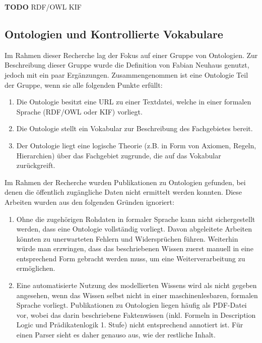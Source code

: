 \documentclass{article}
\begin{document}
\textbf{TODO}
RDF/OWL
KIF

\subsection{Ontologien und Kontrollierte Vokabulare}

Im Rahmen dieser Recherche lag der Fokus auf einer Gruppe von Ontologien.
Zur Beschreibung dieser Gruppe wurde die Definition von Fabian Neuhaus \cite{neuhaus2018ontology} genutzt, jedoch mit ein paar Ergänzungen.
Zusammengenommen ist eine Ontologie Teil der Gruppe, wenn sie alle folgenden Punkte erfüllt:

\begin{enumerate}
    \item Die Ontologie besitzt eine URL zu einer Textdatei, welche in einer formalen Sprache (RDF/OWL oder KIF) vorliegt.
    \item Die Ontologie stellt ein Vokabular zur Beschreibung des Fachgebietes bereit.
    \item Der Ontologie liegt eine logische Theorie (z.B. in Form von Axiomen, Regeln, Hierarchien) über das Fachgebiet zugrunde, die auf das Vokabular zurückgreift.
\end{enumerate}

Im Rahmen der Recherche wurden Publikationen zu Ontologien gefunden, bei denen die öffentlich zugängliche Daten nicht ermittelt werden konnten.
Diese Arbeiten wurden aus den folgenden Gründen ignoriert:
\begin{enumerate}
    \item Ohne die zugehörigen Rohdaten in formaler Sprache kann nicht sichergestellt werden, dass eine Ontologie vollständig vorliegt. Davon abgeleitete Arbeiten könnten zu unerwarteten Fehlern und Widersprüchen führen. Weiterhin würde man erzwingen, dass das beschriebenen Wissen zuerst manuell in eine entsprechend Form gebracht werden muss, um eine Weiterverarbeitung zu ermöglichen.
    \item Eine automatisierte Nutzung des modellierten Wissens wird als nicht gegeben angesehen, wenn das Wissen selbst nicht in einer maschinenlesbaren, formalen Sprache vorliegt. Publikationen zu Ontologien liegen häufig als PDF-Datei vor, wobei das darin beschriebene Faktenwissen (inkl. Formeln in Description Logic und Prädikatenlogik 1. Stufe) nicht entsprechend annotiert ist. Für einen Parser sieht es daher genauso aus, wie der restliche Inhalt.
\end{enumerate}
\end{document}
